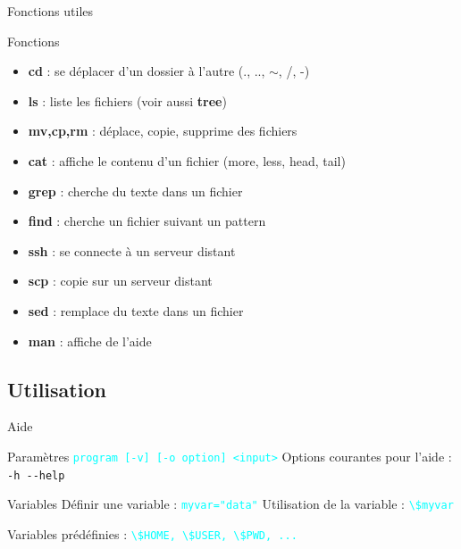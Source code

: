 \documentclass{beamer}
\begin{document}
\begin{frame}[fragile]{Fonctions utiles}
\begin{block}{Fonctions}
\begin{itemize}
\item \textbf{cd} : se déplacer d'un dossier à l'autre (., .., $\sim$, /, -)
\item \textbf{ls} : liste les fichiers (voir aussi \textbf{tree})
\item \textbf{mv,cp,rm} : déplace, copie, supprime des fichiers
\item \textbf{cat} : affiche le contenu d'un fichier (more, less, head, tail)
\item \textbf{grep} : cherche du texte dans un fichier
\item \textbf{find} : cherche un fichier suivant un pattern
\item \textbf{ssh} : se connecte à un serveur distant
\item \textbf{scp} : copie sur un serveur distant
\item \textbf{sed} : remplace du texte dans un fichier
\item \textbf{man} : affiche de l'aide
\end{itemize}
\end{block}
\end{frame}

\subsection{Utilisation}

\begin{frame}[fragile]{Aide}

\begin{block}{Paramètres}
\textcolor{cyan}{\verb?program [-v] [-o option] <input>?} \linebreak 
Options courantes pour l'aide : \verb?-h --help?
\end{block}

\begin{block}{Variables}
Définir une variable :
\textcolor{cyan}{\verb?myvar="data"?} \linebreak
Utilisation de la variable :
\textcolor{cyan}{\verb?\$myvar?} \linebreak

Variables prédéfinies : \textcolor{cyan}{\verb?\$HOME, \$USER, \$PWD, ...?}
\end{block}

\end{frame}
\end{document}
